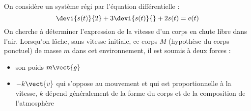 On considère un système régi par l'équation différentielle :
\[
\devi{s(t)}{2}+3\devi{s(t)}{}+2s(t)=e(t)
\]
On cherche à déterminer l'expression de la vitesse d'un corps en chute libre 
dans l'air. 
Lorsqu'on lâche, sans vitesse initiale, ce corps $M$ (hypothèse du corps 
ponctuel) de masse $m$
dans cet environnement, il est soumis à deux forces :
\begin{itemize}
    \item son poids $m\vect{g}$
    \item $-k\vect{v}$ qui s'oppose au mouvement et qui 
        est proportionnelle à la vitesse, $k$ dépend généralement 
        de la forme du corps et de la composition de l'atmosphère
\end{itemize}
